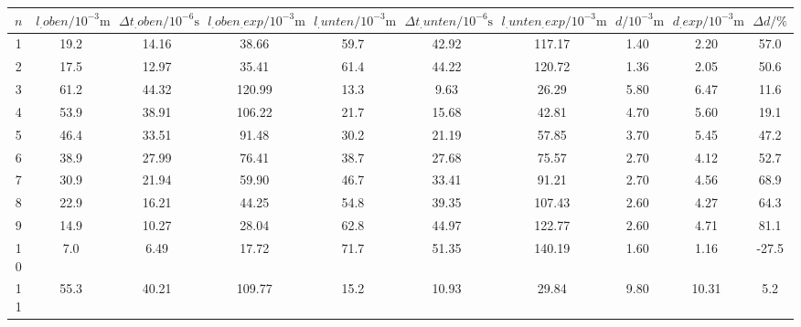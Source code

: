 \label{tab:tabAScan2}
	\begin{tabular}{S[table-format=1.0]S[table-format=2.1]S[table-format=2.2]S[table-format=2.2]S[table-format=2.1]S[table-format=2.2]S[table-format=2.2]S[table-format=2.2]S[table-format=2.2]S[table-format=2.1]}
		\toprule
		{$n$} & {$l_.{oben}/10^{-3}\si{\metre}$} & {$\Delta t_.{oben}/10^{-6}\si{\second}$} & {$l_.{oben_.{exp}}/10^{-3}\si{\metre}$} & {$l_.{unten}/10^{-3}\si{\metre}$} & {$\Delta t_.{unten}/10^{-6}\si{\second}$} & {$l_.{unten_.{exp}}/10^{-3}\si{\metre}$} & {$d/10^{-3}\si{\metre}$} & {$d_.{exp}/10^{-3}\si{\metre}$} & {$\Delta d/\%$} \\
		 & 19.2 & 14.16 & 38.66 & 59.7 & 42.92 & 117.17 & 1.40 & 2.20 & 57.0 \\
		2 & 17.5 & 12.97 & 35.41 & 61.4 & 44.22 & 120.72 & 1.36 & 2.05 & 50.6 \\
		3 & 61.2 & 44.32 & 120.99 & 13.3 & 9.63 & 26.29 & 5.80 & 6.47 & 11.6 \\
		4 & 53.9 & 38.91 & 106.22 & 21.7 & 15.68 & 42.81 & 4.70 & 5.60 & 19.1 \\
		5 & 46.4 & 33.51 & 91.48 & 30.2 & 21.19 & 57.85 & 3.70 & 5.45 & 47.2 \\
		6 & 38.9 & 27.99 & 76.41 & 38.7 & 27.68 & 75.57 & 2.70 & 4.12 & 52.7 \\
		7 & 30.9 & 21.94 & 59.90 & 46.7 & 33.41 & 91.21 & 2.70 & 4.56 & 68.9 \\
		8 & 22.9 & 16.21 & 44.25 & 54.8 & 39.35 & 107.43 & 2.60 & 4.27 & 64.3 \\
		9 & 14.9 & 10.27 & 28.04 & 62.8 & 44.97 & 122.77 & 2.60 & 4.71 & 81.1 \\
		10 & 7.0 & 6.49 & 17.72 & 71.7 & 51.35 & 140.19 & 1.60 & 1.16 & -27.5 \\
		11 & 55.3 & 40.21 & 109.77 & 15.2 & 10.93 & 29.84 & 9.80 & 10.31 & 5.2 \\
		\bottomrule
	\end{tabular}
